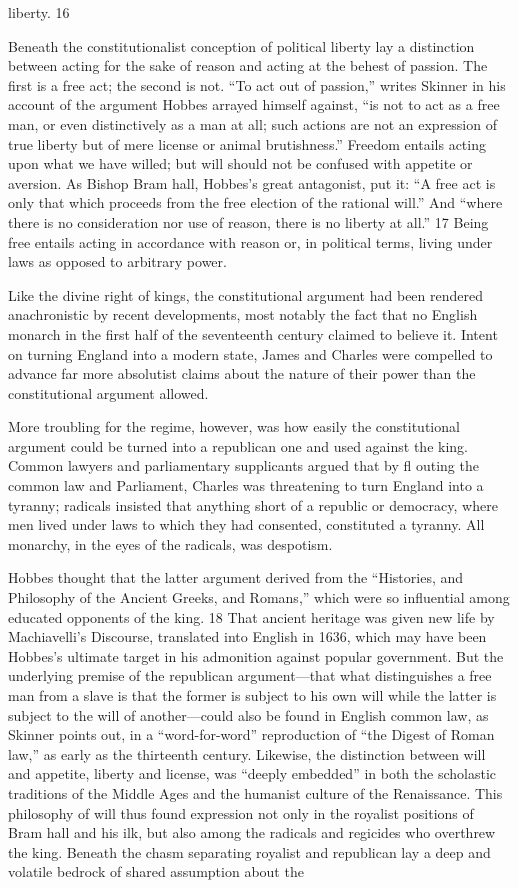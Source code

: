 liberty. {\color{blue} 16 } {\par} Beneath the constitutionalist conception of political liberty lay a distinction between acting for the sake of reason and acting at the behest of passion. The first is a free act; the second is not. “To act out of passion,” writes Skinner in his account of the argument Hobbes arrayed himself against, “is not to act as a free man, or even distinctively as a man at all; such actions are not an expression of true liberty but of mere license or animal brutishness.” Freedom entails acting upon what we have willed; but will should not be confused with appetite or aversion. As Bishop Bram hall, Hobbes’s great antagonist, put it: “A free act is only that which proceeds from the free election of the rational will.” And “where there is no consideration nor use of reason, there is no liberty at all.” {\color{blue} 17 } Being free entails acting in accordance with reason or, in political terms, living under laws as opposed to arbitrary power.{\par} Like the divine right of kings, the constitutional argument had been rendered anachronistic by recent developments, most notably the fact that no English monarch in the first half of the seventeenth century claimed to believe it. Intent on turning England into a modern state, James and Charles were compelled to advance far more absolutist claims about the nature of their power than the constitutional argument allowed.{\par} More troubling for the regime, however, was how easily the constitutional argument could be turned into a republican one and used against the king. Common lawyers and parliamentary supplicants argued that by fl outing the common law and Parliament, Charles was threatening to turn England into a tyranny; radicals insisted that anything short of a republic or democracy, where men lived under laws to which they had consented, constituted a tyranny. All monarchy, in the eyes of the radicals, was despotism.{\par} Hobbes thought that the latter argument derived from the “Histories, and Philosophy of the Ancient Greeks, and Romans,” which were so influential among educated opponents of the king. {\color{blue} 18 } That ancient heritage was given new life by Machiavelli’s Discourse, translated into English in 1636, which may have been Hobbes’s ultimate target in his admonition against popular government. But the underlying premise of the republican argument—that what distinguishes a free man from a slave is that the former is subject to his own will while the latter is subject to the will of another—could also be found in English common law, as Skinner points out, in a “word-for-word” reproduction of “the Digest of Roman law,” as early as the thirteenth century. Likewise, the distinction between will and appetite, liberty and license, was “deeply embedded” in both the scholastic traditions of the Middle Ages and the humanist culture of the Renaissance. This philosophy of will thus found expression not only in the royalist positions of Bram hall and his ilk, but also among the radicals and regicides who overthrew the king. Beneath the chasm separating royalist and republican lay a deep and volatile bedrock of shared assumption about the 